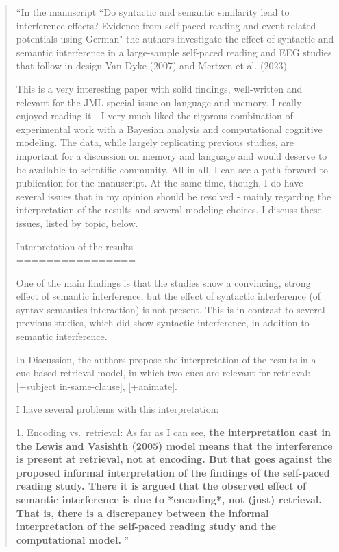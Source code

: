 \documentclass[12pt]{article}
\begin{document}
\begin{quote}
``In the manuscript ``Do syntactic and semantic similarity lead to interference effects? Evidence from self-paced reading and event-related potentials using German" the authors investigate the effect of syntactic and semantic interference in a large-sample self-paced reading and EEG studies that follow in design Van Dyke (2007) and Mertzen et al. (2023).

This is a very interesting paper with solid findings, well-written and relevant for the JML special issue on language and memory. I really enjoyed reading it - I very much liked the rigorous combination of experimental work with a Bayesian analysis and computational cognitive modeling. The data, while largely replicating previous studies, are important for a discussion on memory and language and would deserve to be available to scientific community. All in all, I can see a path forward to publication for the manuscript. At the same time, though, I do have several issues that in my opinion should be resolved - mainly regarding the interpretation of the results and several modeling choices. I discuss these issues, listed by topic, below.

Interpretation of the results\\
================

One of the main findings is that the studies show a convincing, strong effect of semantic interference, but the effect of syntactic interference (of syntax-semantics interaction) is not present. This is in contrast to several previous studies, which did show syntactic interference, in addition to semantic interference.

In Discussion, the authors propose the interpretation of the results in a cue-based retrieval model, in which two cues are relevant for retrieval: [+subject in-same-clause], [+animate].

I have several problems with this interpretation:

1. Encoding vs.\ retrieval: As far as I can see, \textbf{the interpretation cast in the Lewis and Vasishth (2005) model means that the interference is present at retrieval, not at encoding. But that goes against the proposed informal interpretation of the findings of the self-paced reading study. There it is argued that the observed effect of semantic interference is due to *encoding*, not (just) retrieval. That is, there is a discrepancy between the informal interpretation of the self-paced reading study and the computational model.} ''\end{quote}
\end{document}
